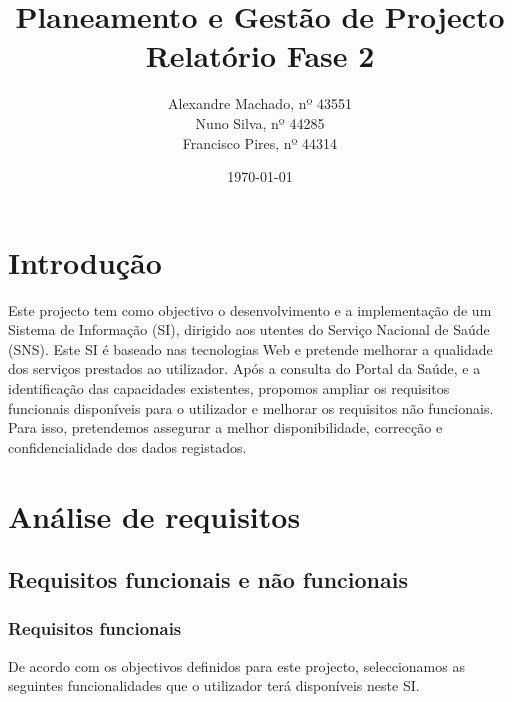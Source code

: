 \documentclass[12pt, a4paper, twoside]{report} %
\begin{document}
\title{%
	\textbf{Planeamento e Gestão de Projecto}\\ 
	\large Relatório Fase 2
}

\author{%
Alexandre Machado, nº 43551 \\
Nuno Silva, nº 44285 \\
Francisco Pires, nº 44314 \\
}

\date{\today}
\maketitle
\tableofcontents

\chapter{Introdução}

Este projecto tem como objectivo o desenvolvimento e a implementação de um Sistema de Informação (SI), dirigido aos utentes do Serviço Nacional de Saúde (SNS). Este SI é baseado nas tecnologias Web e pretende melhorar a qualidade dos serviços prestados ao utilizador. Após a consulta do Portal da Saúde, e a identificação das capacidades existentes, propomos ampliar os requisitos funcionais disponíveis para o utilizador e melhorar os requisitos não funcionais. Para isso, pretendemos assegurar a melhor disponibilidade, correcção e confidencialidade dos dados registados.

\chapter{Análise de requisitos}

\section{Requisitos funcionais e não funcionais}

\subsection{Requisitos funcionais}

De acordo com os objectivos definidos para este projecto, seleccionamos as seguintes funcionalidades que o utilizador terá disponíveis neste SI.
\end{document}
